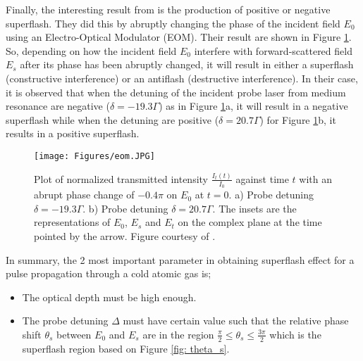 Finally,  the interesting result from  is the production of positive or negative superflash. They did this by abruptly changing the phase of the incident field $E_{0}$ using an Electro-Optical Modulator (EOM). Their result are shown in Figure \ref{fig: eom}. So, depending on how the incident field $E_{0}$ interfere with forward-scattered field $E_{s}$ after its phase has been abruptly changed, it will result in either a superflash (constructive interference) or an antiflash (destructive interference). In their case, it is observed that when the detuning of the incident probe laser from medium resonance are negative ($\delta = -19.3 \Gamma$) as in Figure \ref{fig: eom}a, it will result in a negative superflash while when the detuning are positive ($\delta = 20.7 \Gamma$) for Figure \ref{fig: eom}b, it results in a positive superflash.

\begin{figure}
    \centering
    \texttt{[image: Figures/eom.JPG]}
    \caption[Plot of Normalized Transmitted Intensity Showcasing Superflash and Antiflash Phenomena]{Plot of normalized transmitted intensity $\frac{I_{t}(t)}{I_{0}}$ against time $t$ with an abrupt phase change of $-0.4\pi$ on $E_{0}$ at $t = 0$. a) Probe detuning $\delta = -19.3\Gamma$. b) Probe detuning $\delta = 20.7\Gamma$. The insets are the representations of $E_{0}$, $E_{s}$ and $E_{t}$ on the complex plane at the time pointed by the arrow. Figure courtesy of \protect{}.}
    \label{fig: eom}
\end{figure}

In summary, the 2 most important parameter in obtaining superflash effect for a pulse propagation through a cold atomic gas is;

\begin{itemize}
    \item The optical depth must be high enough.
    \item The probe detuning $\Delta$ must have certain value such that the relative phase shift $\theta_{s}$ between $E_{0}$ and $E_{s}$ are in the region $\frac{\pi}{2} \leq \theta_{s} \leq \frac{3\pi}{2}$ which is the superflash region based on Figure \ref{fig: theta_s}.
\end{itemize}

